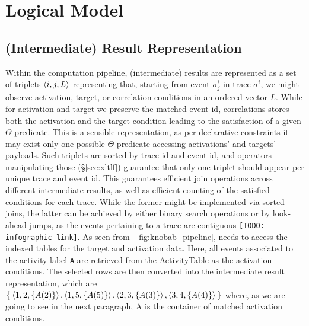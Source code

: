 \section{Logical Model}

\subsection{(Intermediate) Result Representation}
Within the computation pipeline, (intermediate) results are represented as a set of triplets $\braket{i,j,L}$ representing that, starting from event $\sigma^i_j$ in trace $\sigma^i$, we might observe activation, target, or correlation conditions in an ordered vector $L$.  While for activation and target %
we %
preserve 
the matched event id,
correlations stores
both the activation and the target condition leading to the satisfaction of a given $\Theta$ predicate. This is a sensible representation, as per declarative constraints it may exist only one possible $\Theta$ predicate accessing activations' and targets' payloads. Such triplets are sorted by trace id and event id, and operators manipulating those (\S\ref{sec:xltlf}) guarantee that only one triplet should appear per unique trace and event id. This guarantees efficient join operations across different intermediate results, as well as efficient counting of the satisfied conditions for each trace. While the former might be implemented via sorted joins, the latter can be achieved by either binary search operations or by look-ahead jumps, as the events pertaining to a trace are contiguous  \texttt{\color{red}[TODO: infographic link]}.
As seen from \figurename~\ref{fig:knobab_pipeline},  needs to access the indexed tables for the target and activation data. Here, all events associated to the activity label \texttt{A} are retrieved from the \textsf{ActivityTable} as the activation conditions. The selected rows are then converted into the intermediate result representation, which are $\Set{\braket{1,2,\{A(2)\}}, \braket{1,5,\{A(5)\}}, \braket{2,3,\{A(3)\}}, \braket{3,4,\{A(4)\}}}$ where, as we are going to see in the next paragraph, A is the container of matched activation conditions. 

